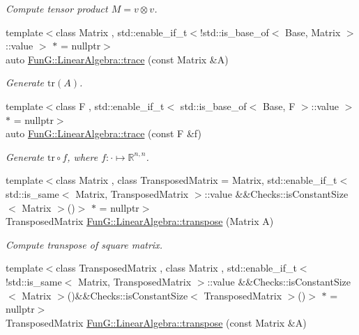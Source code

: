 \begin{DoxyCompactItemize}
\begin{DoxyCompactList}\small\item\em Compute tensor product $ M = v \otimes v $. \end{DoxyCompactList}\item 
{\footnotesize template$<$class Matrix , std\-::enable\-\_\-if\-\_\-t$<$!std\-::is\-\_\-base\-\_\-of$<$ Base, Matrix $>$\-::value $>$ $\ast$  = nullptr$>$ }\\auto \hyperlink{group__LinearAlgebraGroup_ga4d73eb4d46dd9196a31e2d6d557d509e}{Fun\-G\-::\-Linear\-Algebra\-::trace} (const Matrix \&A)
\begin{DoxyCompactList}\small\item\em Generate $\mathrm{tr}(A)$. \end{DoxyCompactList}\item 
{\footnotesize template$<$class F , std\-::enable\-\_\-if\-\_\-t$<$ std\-::is\-\_\-base\-\_\-of$<$ Base, F $>$\-::value $>$ $\ast$  = nullptr$>$ }\\auto \hyperlink{group__LinearAlgebraGroup_ga950717870525c43be79245413717673c}{Fun\-G\-::\-Linear\-Algebra\-::trace} (const F \&f)
\begin{DoxyCompactList}\small\item\em Generate $\mathrm{tr}\circ f$, where $f:\cdot\mapsto\mathbb{R}^{n,n} $. \end{DoxyCompactList}\item 
\hypertarget{group__LinearAlgebraGroup_gaf299ac9490ae23da0a3a3d784e379d1f}{{\footnotesize template$<$class Matrix , class Transposed\-Matrix  = Matrix, std\-::enable\-\_\-if\-\_\-t$<$ std\-::is\-\_\-same$<$ Matrix, Transposed\-Matrix $>$\-::value \&\&\-Checks\-::is\-Constant\-Size$<$ Matrix $>$()$>$ $\ast$  = nullptr$>$ }\\Transposed\-Matrix \hyperlink{group__LinearAlgebraGroup_gaf299ac9490ae23da0a3a3d784e379d1f}{Fun\-G\-::\-Linear\-Algebra\-::transpose} (Matrix A)}\label{group__LinearAlgebraGroup_gaf299ac9490ae23da0a3a3d784e379d1f}

\begin{DoxyCompactList}\small\item\em Compute transpose of square matrix. \end{DoxyCompactList}\item 
\hypertarget{group__LinearAlgebraGroup_gaffe414459cb85a455a3c5a2099cfc6ee}{{\footnotesize template$<$class Transposed\-Matrix , class Matrix , std\-::enable\-\_\-if\-\_\-t$<$!std\-::is\-\_\-same$<$ Matrix, Transposed\-Matrix $>$\-::value \&\&\-Checks\-::is\-Constant\-Size$<$ Matrix $>$()\&\&\-Checks\-::is\-Constant\-Size$<$ Transposed\-Matrix $>$()$>$ $\ast$  = nullptr$>$ }\\Transposed\-Matrix \hyperlink{group__LinearAlgebraGroup_gaffe414459cb85a455a3c5a2099cfc6ee}{Fun\-G\-::\-Linear\-Algebra\-::transpose} (const Matrix \&A)}\label{group__LinearAlgebraGroup_gaffe414459cb85a455a3c5a2099cfc6ee}


\end{DoxyCompactItemize}
